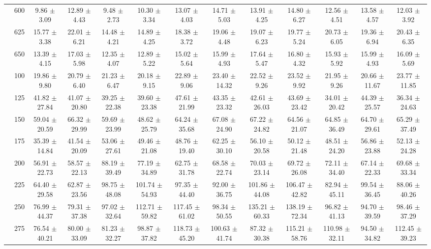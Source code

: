 \begin{table}[h]
{\begin{tabular}{
        ccccccccccccc}
 & 600& 9.86 $\pm$ 3.09& 12.89 $\pm$ 4.43& 9.48 $\pm$ 2.73& 10.30 $\pm$ 3.34& 13.07 $\pm$ 4.03& 14.71 $\pm$ 5.03& 13.91 $\pm$ 4.25& 14.80 $\pm$ 6.27& 12.56 $\pm$ 4.51& 13.58 $\pm$ 4.57& 12.03 $\pm$ 3.92 \\ 
 & 625& 15.77 $\pm$ 3.38& 22.01 $\pm$ 6.21& 14.48 $\pm$ 4.21& 14.89 $\pm$ 4.25& 18.38 $\pm$ 3.72& 19.06 $\pm$ 4.48& 19.07 $\pm$ 6.23& 19.77 $\pm$ 5.24& 20.73 $\pm$ 6.05& 19.36 $\pm$ 6.94& 20.43 $\pm$ 6.35 \\ 
 & 650& 13.39 $\pm$ 4.15& 17.03 $\pm$ 5.98& 12.35 $\pm$ 4.07& 12.89 $\pm$ 5.22& 15.02 $\pm$ 5.64& 15.99 $\pm$ 4.93& 17.64 $\pm$ 5.47& 16.80 $\pm$ 4.32& 15.93 $\pm$ 5.92& 15.99 $\pm$ 4.93& 16.09 $\pm$ 5.69 \\ \hline 
 & 100& 19.86 $\pm$ 9.80& 20.79 $\pm$ 6.40& 21.23 $\pm$ 6.47& 20.18 $\pm$ 9.15& 22.89 $\pm$ 9.06& 23.40 $\pm$ 14.32& 22.52 $\pm$ 9.26& 23.52 $\pm$ 9.92& 21.95 $\pm$ 9.26& 20.66 $\pm$ 11.67& 23.77 $\pm$ 11.85 \\ 
 & 125& 41.82 $\pm$ 27.84& 41.07 $\pm$ 20.80& 39.25 $\pm$ 22.38& 39.60 $\pm$ 23.38& 47.61 $\pm$ 21.99& 43.35 $\pm$ 23.32& 42.61 $\pm$ 26.03& 43.69 $\pm$ 23.42& 34.01 $\pm$ 20.42& 44.39 $\pm$ 25.57& 36.34 $\pm$ 24.63 \\ 
 & 150& 59.04 $\pm$ 20.59& 66.32 $\pm$ 29.99& 59.69 $\pm$ 23.99& 48.62 $\pm$ 25.79& 64.24 $\pm$ 35.68& 67.08 $\pm$ 24.90& 67.22 $\pm$ 24.82& 64.56 $\pm$ 21.07& 64.85 $\pm$ 36.49& 64.70 $\pm$ 29.61& 65.29 $\pm$ 37.49 \\ 
 & 175& 35.39 $\pm$ 14.84& 41.54 $\pm$ 20.09& 53.06 $\pm$ 27.61& 49.46 $\pm$ 21.08& 48.76 $\pm$ 19.40& 62.25 $\pm$ 30.10& 56.10 $\pm$ 20.58& 50.12 $\pm$ 21.48& 48.51 $\pm$ 24.20& 56.86 $\pm$ 23.88& 52.13 $\pm$ 24.28 \\ 
 & 200& 56.91 $\pm$ 22.73& 58.57 $\pm$ 22.13& 88.19 $\pm$ 39.49& 77.19 $\pm$ 34.89& 62.75 $\pm$ 31.78& 68.58 $\pm$ 22.74& 70.03 $\pm$ 23.14& 69.72 $\pm$ 26.08& 72.11 $\pm$ 34.40& 67.14 $\pm$ 22.33& 69.68 $\pm$ 33.34 \\ 
 & 225& 64.40 $\pm$ 29.58& 62.87 $\pm$ 23.56& 98.75 $\pm$ 48.08& 101.74 $\pm$ 54.93& 97.35 $\pm$ 44.40& 92.00 $\pm$ 36.75& 101.86 $\pm$ 44.08& 106.47 $\pm$ 42.82& 82.94 $\pm$ 45.11& 99.54 $\pm$ 36.45& 88.06 $\pm$ 40.26 \\ 
 & 250& 76.99 $\pm$ 44.37& 79.31 $\pm$ 37.38& 97.02 $\pm$ 32.64& 112.71 $\pm$ 59.82& 117.45 $\pm$ 61.02& 98.34 $\pm$ 50.55& 135.21 $\pm$ 60.33& 138.19 $\pm$ 72.34& 96.82 $\pm$ 41.13& 94.70 $\pm$ 39.59& 98.46 $\pm$ 37.29 \\ 
 & 275& 76.54 $\pm$ 40.21& 80.00 $\pm$ 33.09& 81.23 $\pm$ 32.27& 98.87 $\pm$ 37.82& 118.73 $\pm$ 45.20& 100.63 $\pm$ 41.74& 87.32 $\pm$ 30.38& 115.21 $\pm$ 58.76& 110.98 $\pm$ 32.11& 94.50 $\pm$ 34.82& 112.45 $\pm$ 39.23 \\ 

\end{tabular}}
\end{table}
